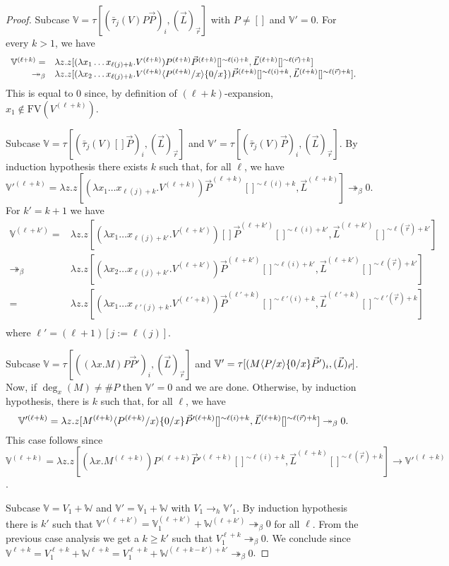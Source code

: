 \documentclass{LMCS}
\newcommand{\card}[1]{\# #1}
\newcommand{\lam}{\ensuremath{\lambda}}
\newcommand{\FV}{\mathrm{FV}}
\newcommand{\msto}{\twoheadrightarrow}
\newcommand{\subst}[2]{\{ #2 / #1 \}}	\newcommand{\dg}[2]{\mathrm{deg}_{#1}(#2)} \newcommand{\obsle}{\sqsubseteq_{\mathcal{O}}}
\newcommand{\seq}[1]{\vec{#1}}
\newcommand{\sV}{\mathbb{V}}
\newcommand{\sW}{\mathbb{W}}
\newcommand{\gt}{\ensuremath{\tau}}
\newcommand{\gto}{\ensuremath{\bar\tau}}
\begin{document}
\begin{proof}
Subcase $\sV = \gt[(\gto_j(V)P\seq P)_i,(\seq L)_{\seq r}]$ with $P\neq []$ and $\sV' = 0$.
For every $k>1$, we have 
$$
\begin{array}{rl}
\sV^{(\ell+k)} = &\lam z.z[(\lam x_1\dots x_{\ell(j)+k}.V^{(\ell+k)})P^{(\ell+k)}\seq P^{(\ell+k)}[]^{\sim \ell(i)+k},\seq L^{(\ell+k)}[]^{\sim\ell(\seq r)+k}]\\
\msto_\beta&\lam z.z[(\lam x_2\dots x_{\ell(j)+k}.V^{(\ell+k)}\lsubst{x}{P^{(\ell+k)}}\subst{x}{0})\seq P^{(\ell+k)}[]^{\sim \ell(i)+k},\seq L^{(\ell+k)}[]^{\sim\ell(\seq r)+k}].\\
\end{array}
$$ 
This is equal to 0 since, by definition of $(\ell+k)$-expansion, $x_1\notin\FV(V^{(\ell+k)})$.

Subcase $\sV = \gt[(\gto_j(V)[]\seq P)_i,(\seq L)_{\seq r}]$ and $\sV' = \gt[(\gto_j(V)\seq P)_i,(\seq L)_{\seq r}]$. 
By induction hypothesis there exists $k$ such that,  for all $\ell$, we have
$$ 
	\sV'^{(\ell+k)} = \lam z.z[(\lam x_1\ldots x_{\ell(j) + k}. V^{(\ell +k)})\seq P^{(\ell+k)}[]^{\sim\ell(i)+k},\seq L^{(\ell+k)}]\msto_\beta 0.
$$
For $k' = k + 1$ we have 
$$
	\begin{array}{rl}
	\sV^{(\ell + k')} = &\lam z.z[(\lam x_1\ldots x_{\ell(j) + k'}.V^{(\ell+k')})[]\seq P^{(\ell+k')}[]^{\sim\ell(i)+k'},\seq L^{(\ell+k')}[]^{\sim\ell(\seq r)+k'}]\\
	\msto_\beta&\lam z.z[(\lam x_2\ldots x_{\ell(j) + k'}. V^{(\ell+k')})\seq P^{(\ell+k')}[]^{\sim\ell(i)+k'},\seq L^{(\ell+k')}[]^{\sim\ell(\seq r)+k'}]\\
	=&\lam z.z[(\lam x_1\ldots x_{\ell'(j) + k}. V^{(\ell'+k)})\seq P^{(\ell'+k)}[]^{\sim\ell'(i)+k},\seq L^{(\ell'+k)}[]^{\sim\ell'(\seq r)+k}]\\
	\end{array}
$$
where $\ell' = (\ell+1)[j:=\ell(j)]$.

Subcase $\sV = \gt[((\lam x.M)P\seq P')_i,(\seq L)_{\seq r}]$ and $\sV' = \gt[(M\lsubst{x}{P}\subst{x}{0}\seq P')_i,(\seq L)_{\seq r}]$.
Now, if $\deg_{x}(M) \neq \card P$ then $\sV' = 0$ and we are done. Otherwise, by induction hypothesis, there is $k$ such that, for all $\ell$, we have
$$
\sV'^{(\ell+k)} = \lam z.z[M^{(\ell+k)}\lsubst{x}{P^{(\ell+k)}}\subst{x}{0}\seq P'^{(\ell+k)}[]^{\sim\ell(i)+k},\seq L^{(\ell+k)}[]^{\sim\ell(\seq r)+k}]\msto_\beta 0.
$$
This case follows since $\sV^{(\ell+k)} = \lam z.z[(\lam x.M^{(\ell+k)})P^{(\ell+k)}\seq P'^{(\ell+k)}[]^{\sim\ell(i)+k}, \seq L^{(\ell+k)}[]^{\sim\ell(\seq r)+k}]\to \sV'^{(\ell+k)}$.

Subcase $\sV = V_1+\sW$ and $\sV' = \sV_1+\sW$ with $V_1\to_h \sV'_1$. 
By induction hypothesis there is $k'$ such that $\sV'^{(\ell + k')} = \sV_1^{(\ell + k')}+\sW^{(\ell + k')}\msto_\beta 0$ for all $\ell$.
From the previous case analysis we get a $k\ge k'$ such that $V_1^{\ell+k}\msto_\beta 0$.
We conclude since $\sV^{\ell+k} = V_1^{\ell+k}+\sW^{\ell+k} = V_1^{\ell+k}+\sW^{(\ell+k-k')+k'}\msto_\beta 0$.
\end{proof}
\end{document}
